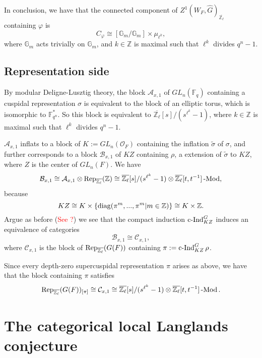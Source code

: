 In conclusion, we have that the connected component of $Z^1(W_F, \hat{G})_{\overline{\mathbb{Z}_{\ell}}}$ containing $\varphi$ is
$$C_{\varphi} \cong [\mathbb{G}_m/\mathbb{G}_m] \times \mu_{\ell^k},$$
where $\mathbb{G}_m$ acts trivially on $\mathbb{G}_m$, and $k \in \mathbb{Z}$ is maximal such that $\ell^k$ divides $q^n-1$.


\section{Representation side}

By modular Deligne-Lusztig theory, the block $\mathcal{A}_{x,1}$ of $GL_n(\mathbb{F}_q)$ containing a cuspidal representation $\sigma$ is equivalent to the block of an elliptic torus, which is isomorphic to $\mathbb{F}_{q^n}^*$. So this block is equivalent to $\overline{\mathbb{Z}_{\ell}}[s]/(s^{\ell^k}-1)$, where $k \in \mathbb{Z}$ is maximal such that $\ell^k$ divides $q^n-1$.

$\mathcal{A}_{x,1}$ inflats to a block of $K:=GL_n(\mathcal{O}_F)$ containing the inflation $\tilde{\sigma}$ of $\sigma$, and further corresponds to a block $\mathcal{B}_{x,1}$ of $KZ$ containing $\rho$, a extension of $\tilde{\sigma}$ to $KZ$, where $Z$ is the center of $GL_n(F)$. We have
$$\mathcal{B}_{x,1} \cong \mathcal{A}_{x,1} \otimes \operatorname{\operatorname{Rep}}_{\overline{\mathbb{Z}_{\ell}}}(\mathbb{Z}) \cong \overline{\mathbb{Z}_{\ell}}[s]/(s^{\ell^k}-1) \otimes \overline{\mathbb{Z}_{\ell}}[t, t^{-1}]\operatorname{-Mod},$$
because
$$KZ \cong K \times \{\operatorname{\operatorname{diag}}(\pi^m, ..., \pi^m | m \in \mathbb{Z})\} \cong K \times \mathbb{Z}.$$
Argue as before (\textcolor{red}{See ?}) we see that the compact induction $\operatorname{\operatorname{c-Ind}}_{KZ}^G$ induces an equivalence of categories
$$\mathcal{B}_{x,1} \cong \mathcal{C}_{x,1},$$
where $\mathcal{C}_{x,1}$ is the block of $\operatorname{\operatorname{Rep}}_{\overline{\mathbb{Z}_{\ell}}}(G(F))$ containing $\pi:=\operatorname{\operatorname{c-Ind}}_{KZ}^G\rho$.

Since every depth-zero supercuspidal representation $\pi$ arises as above, we have that the block containing $\pi$ satisfies
$$\operatorname{\operatorname{Rep}}_{\overline{\mathbb{Z}_{\ell}}}(G(F))_{[\pi]} \cong \mathcal{C}_{x,1} \cong \overline{\mathbb{Z}_{\ell}}[s]/(s^{\ell^k}-1) \otimes \overline{\mathbb{Z}_{\ell}}[t, t^{-1}]\operatorname{-Mod}.$$



\chapter{The categorical local Langlands conjecture}


